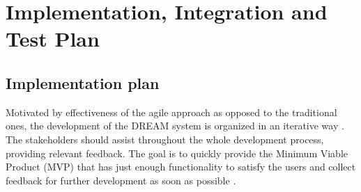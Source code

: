 \chapter{Implementation, Integration and Test Plan}
\section{Implementation plan}
Motivated by effectiveness of the agile approach as opposed to the traditional ones, the development of the DREAM system is organized in an iterative way \cite{agile}. The stakeholders should assist throughout the whole development process, providing relevant feedback. The goal is to quickly provide the Minimum Viable Product (MVP) that has just enough functionality to satisfy the users and collect feedback for further development as soon as possible \cite{mvp}.

